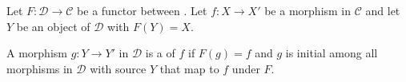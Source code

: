 \begin{definition} \label{definition:locally_coCartesian_lift_of_a_morphism_in_an_infinity_category}
Let $F : \mathcal{D} \to \mathcal{C}$ be a functor between . Let $f : X \to X'$ be a morphism in $\mathcal{C}$ and let $Y$ be an object of $\mathcal{D}$ with $F(Y) = X$.

A morphism $g : Y \to Y'$ in $\mathcal{D}$ is a  of $f$ if $F(g) = f$ and $g$ is initial among all morphisms in $\mathcal{D}$ with source $Y$ that map to $f$ under $F$.
\end{definition}
